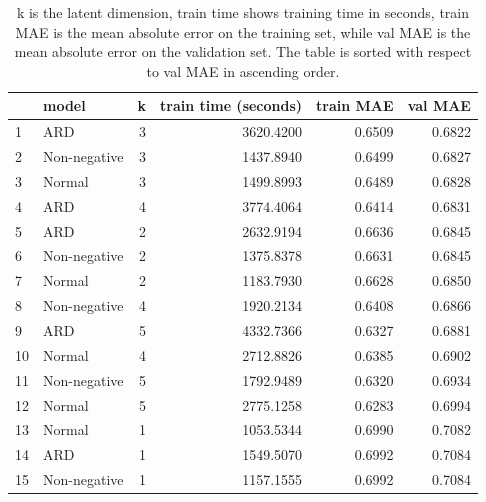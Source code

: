 \documentclass[12pt]{article}
\begin{document}
    \begin{table}[H]
        \centering
        \caption{k is the latent dimension, train time shows training time in seconds, train MAE is the mean absolute error on the training set, while val MAE is the mean absolute error on the validation set. The table is sorted with respect to val MAE in ascending order.}
        \label{table:modelselection}
        \begin{tabular}{llrr|rr}
            \toprule
            {} &         model &  k &  train time (seconds) &  train MAE &  val MAE \\
            \midrule
            1  &           ARD &  3 &             3620.4200 &     0.6509 &   0.6822 \\
            2  &  Non-negative &  3 &             1437.8940 &     0.6499 &   0.6827 \\
            3  &        Normal &  3 &             1499.8993 &     0.6489 &   0.6828 \\
            4  &           ARD &  4 &             3774.4064 &     0.6414 &   0.6831 \\
            5  &           ARD &  2 &             2632.9194 &     0.6636 &   0.6845 \\
            6  &  Non-negative &  2 &             1375.8378 &     0.6631 &   0.6845 \\
            7  &        Normal &  2 &             1183.7930 &     0.6628 &   0.6850 \\
            8  &  Non-negative &  4 &             1920.2134 &     0.6408 &   0.6866 \\
            9  &           ARD &  5 &             4332.7366 &     0.6327 &   0.6881 \\
            10 &        Normal &  4 &             2712.8826 &     0.6385 &   0.6902 \\
            11 &  Non-negative &  5 &             1792.9489 &     0.6320 &   0.6934 \\
            12 &        Normal &  5 &             2775.1258 &     0.6283 &   0.6994 \\
            13 &        Normal &  1 &             1053.5344 &     0.6990 &   0.7082 \\
            14 &           ARD &  1 &             1549.5070 &     0.6992 &   0.7084 \\
            15 &  Non-negative &  1 &             1157.1555 &     0.6992 &   0.7084 \\
            \bottomrule
        \end{tabular}
    \end{table}
    
\end{document}
